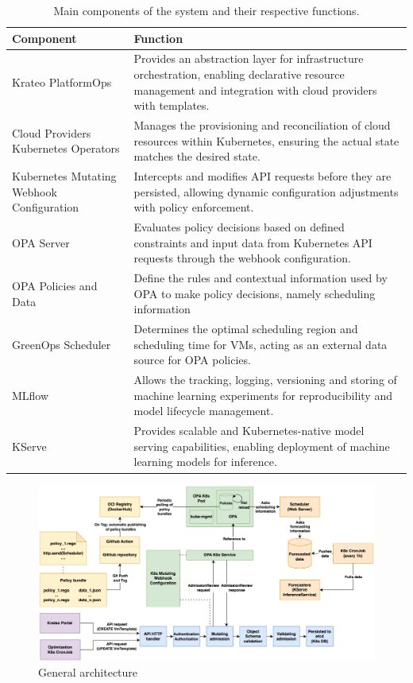 \begin{table}[t]
  \centering
  \renewcommand{\arraystretch}{1.3} %
  \begin{tabularx}{\textwidth}{| l | X |} %
    \hline
    \textbf{Component} & \textbf{Function} \\
    \hline
    Krateo PlatformOps & Provides an abstraction layer for infrastructure orchestration, enabling declarative resource management and integration with cloud providers with templates. \\
    \hline
    Cloud Providers Kubernetes Operators & Manages the provisioning and reconciliation of cloud resources within Kubernetes, ensuring the actual state matches the desired state. \\
    \hline
    Kubernetes Mutating Webhook Configuration & Intercepts and modifies API requests before they are persisted, allowing dynamic configuration adjustments with policy enforcement. \\
    \hline
    OPA Server & Evaluates policy decisions based on defined constraints and input data from Kubernetes API requests through the webhook configuration. \\
    \hline
    OPA Policies and Data & Define the rules and contextual information used by OPA to make policy decisions, namely scheduling information \\
    \hline
    GreenOps Scheduler & Determines the optimal scheduling region and scheduling time for VMs, acting as an external data source for OPA policies. \\
    \hline
    MLflow & Allows the tracking, logging, versioning and storing of machine learning experiments for reproducibility and model lifecycle management. \\
    \hline
    KServe & Provides scalable and Kubernetes-native model serving capabilities, enabling deployment of machine learning models for inference. \\
    \hline
  \end{tabularx}
  \caption{Main components of the system and their respective functions.}
  \label{tab:system_components}
\end{table}

\begin{figure}[t]
  \centering
  \includegraphics[width=1\linewidth]{images/architecture.png}
  \caption{General architecture}
  \label{fig:architecture}
\end{figure}

